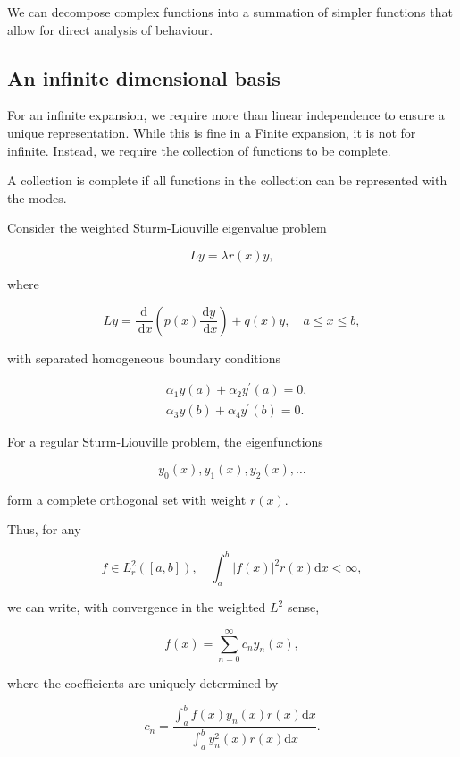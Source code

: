 \begin{remark}
  We can decompose complex functions into a summation of simpler functions that allow for direct analysis of behaviour.
\end{remark}

\subsection{An infinite dimensional basis}

\begin{remark}
  For an infinite expansion, we require more than linear independence to ensure a unique representation. While this is fine in a Finite expansion, it is not for infinite. Instead, we require the collection of functions to be complete.
\end{remark}

\begin{definition}[Complete]
  A collection is complete if all functions in the collection can be represented with the modes.
\end{definition}  

\begin{theorem}
Consider the weighted Sturm-Liouville eigenvalue problem

\[
L y=\lambda r(x) y,
\]

where

\[
L y=\frac{\mathrm{d}}{\mathrm{~d} x}\left(p(x) \frac{\mathrm{d} y}{\mathrm{~d} x}\right)+q(x) y, \quad a \leq x \leq b,
\]

with separated homogeneous boundary conditions

\[
\begin{aligned}
& \alpha_1 y(a)+\alpha_2 y^{\prime}(a)=0, \\
& \alpha_3 y(b)+\alpha_4 y^{\prime}(b)=0 .
\end{aligned}
\]

For a regular Sturm-Liouville problem, the eigenfunctions

\[
y_0(x), y_1(x), y_2(x), \ldots
\]

form a complete orthogonal set with weight \(r(x)\).

Thus, for any

\[
f \in L_r^2([a, b]), \quad \int_a^b|f(x)|^2 r(x) \mathrm{d} x<\infty,
\]

we can write, with convergence in the weighted \(L^2\) sense,

\[
f(x)=\sum_{n=0}^{\infty} c_n y_n(x),
\]

where the coefficients are uniquely determined by

\[
c_n=\frac{\int_a^b f(x) y_n(x) r(x) \mathrm{d} x}{\int_a^b y_n^2(x) r(x) \mathrm{d} x} .
\]
\end{theorem}

